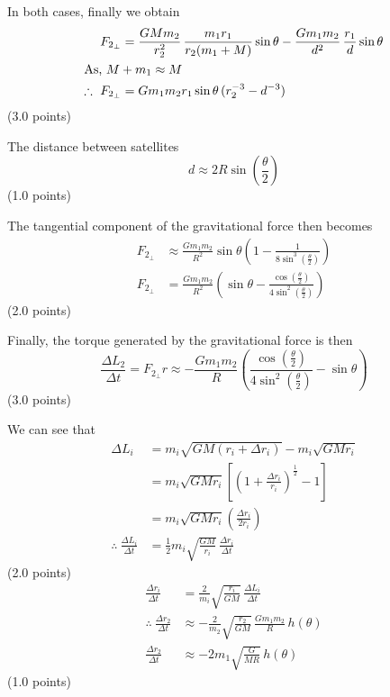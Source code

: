 \begin{description}
  In both cases, finally we obtain
  \begin{align*}
    F_{2_\perp} &= \frac{GMm_2}{r_2^2}\,\frac{m_1 r_1}{r_2(m_1 + M)}\sin\theta
      - \frac{Gm_1 m_2}{d^2}\,\frac{r_1}{d}\sin\theta \\
    \intertext{As, $M + m_1 \approx M$}
    \therefore\ F_{2_\perp} &= Gm_1 m_2 r_1\sin\theta\,(r_2^{-3} - d^{-3})
  \end{align*}
  \hfill(3.0 points)


  The distance between satellites
  \[
    d \approx 2R\sin\left(\frac{\theta}{2}\right)
  \]
  \hfill(1.0 points)

  The tangential component of the gravitational force then becomes
  \begin{align*}
    F_{2_\perp} &\approx \frac{Gm_1 m_2}{R^2}\sin\theta
      \left(1 - \frac{1}{8\sin^3\left(\frac{\theta}{2}\right)}\right) \\
    F_{2_\perp} &= \frac{Gm_1 m_2}{R^2}
      \left(\sin\theta - \frac{\cos\left(\frac{\theta}{2}\right)}
        {4\sin^2\left(\frac{\theta}{2}\right)}\right)
  \end{align*}
  \hfill(2.0 points)

  Finally, the torque generated by the gravitational force is then
  \[
    \frac{\Delta L_2}{\Delta t} = F_{2_\perp} r
      \approx -\frac{Gm_1 m_2}{R}
      \left(\frac{\cos\left(\frac{\theta}{2}\right)}
        {4\sin^2\left(\frac{\theta}{2}\right)} - \sin\theta\right)
  \]
  \hfill(3.0 points)

\item[(d)] We can see that
  \begin{align*}
    \Delta L_i &= m_i\sqrt{GM(r_i + \Delta r_i)} - m_i\sqrt{GMr_i} \\
      &= m_i\sqrt{GMr_i}
         \left[\left(1 + \frac{\Delta r_i}{r_i}\right)^{\frac{1}{2}} - 1\right] \\
      &= m_i\sqrt{GMr_i}\left(\frac{\Delta r_i}{2r_i}\right) \\
    \therefore\ \frac{\Delta L_i}{\Delta t}
      &= \frac{1}{2}m_i\sqrt{\frac{GM}{r_i}}\,\frac{\Delta r_i}{\Delta t}
  \end{align*}
  \hfill(2.0 points)
  \begin{align*}
    \frac{\Delta r_i}{\Delta t}
      &= \frac{2}{m_i}\sqrt{\frac{r_i}{GM}}\,\frac{\Delta L_i}{\Delta t} \\
    \therefore\ \frac{\Delta r_2}{\Delta t}
      &\approx -\frac{2}{m_2}\sqrt{\frac{r_2}{GM}}\,
        \frac{Gm_1 m_2}{R}\,h(\theta) \\
    \frac{\Delta r_2}{\Delta t}
      &\approx -2m_1\sqrt{\frac{G}{MR}}\,h(\theta)
  \end{align*}
  \hfill(1.0 points)


\end{description}
